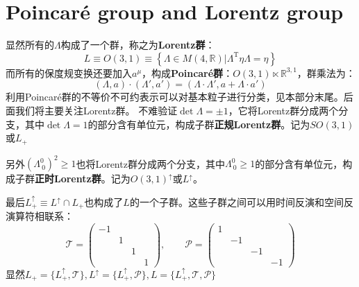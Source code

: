 \section{Poincar\'e group and Lorentz group}
显然所有的$\Lambda$构成了一个群，称之为\textbf{Lorentz群}：
\begin{equation}
	L\equiv O(3,1)\equiv\left\{\Lambda\in M(4,\mathbb{R})|	\Lambda^{\operatorname{T}}\eta\Lambda=\eta\right\}
\end{equation}
而所有的保度规变换还要加入$a^\mu$，构成\textbf{Poincar\'e群}：$O(3,1)\ltimes \mathbb{R}^{3,1}$，群乘法为：
\begin{equation}
	(\Lambda,a)\cdot(\Lambda',a')=(\Lambda\cdot\Lambda',a+\Lambda\cdot a')
\end{equation}
利用Poincar\'e群的不等价不可约表示可以对基本粒子进行分类，见本部分末尾。后面我们将主要关注Lorentz群。
不难验证$\det \Lambda=\pm 1$，它将Lorentz群分成两个分支，其中$\det \Lambda=1$的部分含有单位元，构成子群\textbf{正规Lorentz群}。记为$SO(3,1)$或$L_+$

另外$(\Lambda^0_{\ 0})^2\geq 1$也将Lorentz群分成两个分支，其中$\Lambda^0_{\ 0}\geq1$的部分含有单位元，构成子群\textbf{正时Lorentz群}。记为$O(3,1)^\uparrow$或$L^\uparrow$。

最后$L^\uparrow_+\equiv L^\uparrow\cap L_+$也构成了$L$的一个子群。这些子群之间可以用时间反演和空间反演算符相联系：
\begin{equation}
	\mathcal{T}=\begin{pmatrix}
		-1&  &  & \\
		& 1 &  & \\
		&  & 1 & \\
		&  &  &1
	\end{pmatrix},\quad\quad\mathcal{P}=\begin{pmatrix}
	1&  &  & \\
	& -1 &  & \\
	&  & -1 & \\
	&  &  &-1
	\end{pmatrix}
\end{equation}
显然$L_+=\{L_+^\uparrow,\mathcal{T}\},L^\uparrow=\{L_+^\uparrow,\mathcal{P}\},L=\{L_+^\uparrow,\mathcal{T},\mathcal{P}\}$

